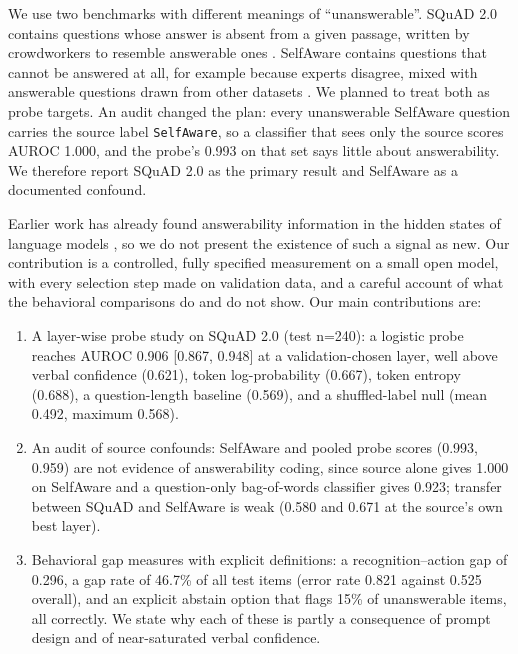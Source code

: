 \documentclass[10pt]{article}
\newcommand{\code}[1]{\texttt{#1}}
\begin{document}
We use two benchmarks with different meanings of ``unanswerable''. SQuAD 2.0 contains questions whose answer is absent from a given passage, written by crowdworkers to resemble answerable ones \citep{rajpurkar2018squad2}. SelfAware contains questions that cannot be answered at all, for example because experts disagree, mixed with answerable questions drawn from other datasets \citep{yin2023selfaware}. We planned to treat both as probe targets. An audit changed the plan: every unanswerable SelfAware question carries the source label \code{SelfAware}, so a classifier that sees only the source scores AUROC 1.000, and the probe's 0.993 on that set says little about answerability. We therefore report SQuAD 2.0 as the primary result and SelfAware as a documented confound.

Earlier work has already found answerability information in the hidden states of language models \citep{slobodkin2023curious,lavi2026directions,wagner2026twoaxes}, so we do not present the existence of such a signal as new. Our contribution is a controlled, fully specified measurement on a small open model, with every selection step made on validation data, and a careful account of what the behavioral comparisons do and do not show. Our main contributions are:
\begin{enumerate}
\item A layer-wise probe study on SQuAD 2.0 (test n=240): a logistic probe reaches AUROC 0.906 [0.867, 0.948] at a validation-chosen layer, well above verbal confidence (0.621), token log-probability (0.667), token entropy (0.688), a question-length baseline (0.569), and a shuffled-label null (mean 0.492, maximum 0.568).
\item An audit of source confounds: SelfAware and pooled probe scores (0.993, 0.959) are not evidence of answerability coding, since source alone gives 1.000 on SelfAware and a question-only bag-of-words classifier gives 0.923; transfer between SQuAD and SelfAware is weak (0.580 and 0.671 at the source's own best layer).
\item Behavioral gap measures with explicit definitions: a recognition--action gap of 0.296, a gap rate of 46.7\% of all test items (error rate 0.821 against 0.525 overall), and an explicit abstain option that flags 15\% of unanswerable items, all correctly. We state why each of these is partly a consequence of prompt design and of near-saturated verbal confidence.
\end{enumerate}

\end{document}
